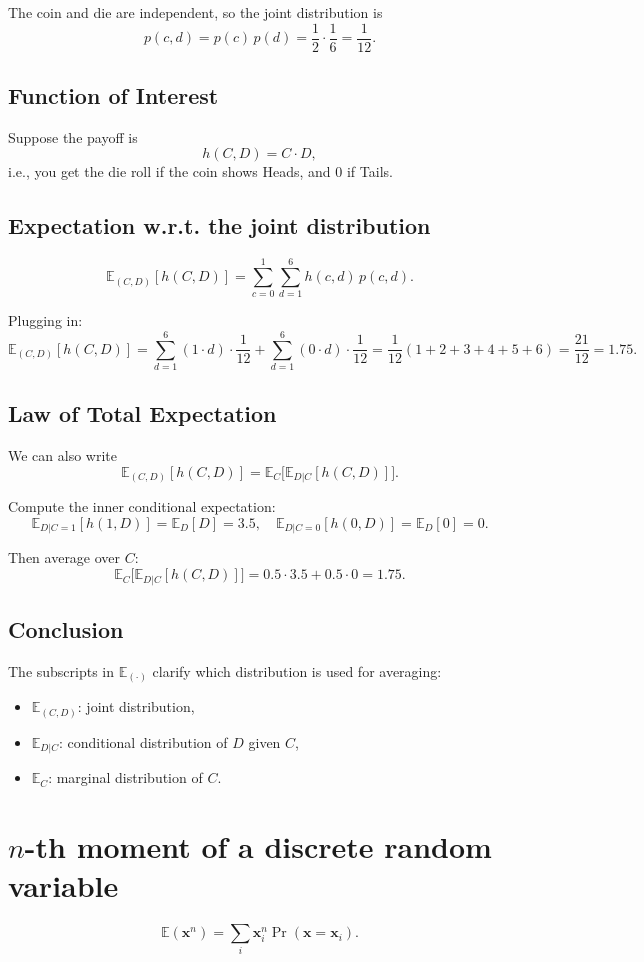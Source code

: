 The coin and die are independent, so the joint distribution is
\[
p(c,d) = p(c)\,p(d) = \frac{1}{2} \cdot \frac{1}{6} = \frac{1}{12}.
\]

\subsection*{Function of Interest}
Suppose the payoff is
\[
h(C,D) = C \cdot D,
\]
i.e., you get the die roll if the coin shows Heads, and 0 if Tails.

\subsection*{Expectation w.r.t. the joint distribution}
\[
\mathbb{E}_{(C,D)}[h(C,D)] 
= \sum_{c=0}^{1} \sum_{d=1}^{6} h(c,d) \, p(c,d).
\]

Plugging in:
\[
\mathbb{E}_{(C,D)}[h(C,D)] 
= \sum_{d=1}^{6} (1 \cdot d) \cdot \frac{1}{12} + \sum_{d=1}^{6} (0 \cdot d) \cdot \frac{1}{12}
= \frac{1}{12} (1+2+3+4+5+6) = \frac{21}{12} = 1.75.
\]

\subsection*{Law of Total Expectation}
We can also write
\[
\mathbb{E}_{(C,D)}[h(C,D)] = \mathbb{E}_C \Big[ \mathbb{E}_{D|C}[h(C,D)] \Big].
\]

Compute the inner conditional expectation:
\[
\mathbb{E}_{D|C=1}[h(1,D)] = \mathbb{E}_D[D] = 3.5, \quad 
\mathbb{E}_{D|C=0}[h(0,D)] = \mathbb{E}_D[0] = 0.
\]

Then average over $C$:
\[
\mathbb{E}_C \Big[ \mathbb{E}_{D|C}[h(C,D)] \Big] 
= 0.5 \cdot 3.5 + 0.5 \cdot 0 = 1.75.
\]

\subsection*{Conclusion}
The subscripts in $\mathbb{E}_{(\cdot)}$ clarify which distribution is used for averaging:
\begin{itemize}
    \item $\mathbb{E}_{(C,D)}$: joint distribution,
    \item $\mathbb{E}_{D|C}$: conditional distribution of $D$ given $C$,
    \item $\mathbb{E}_C$: marginal distribution of $C$.
\end{itemize}

\section{$n$-th moment of a discrete random variable}
\begin{equation}
  \mathbb{E}(\mathbf{x}^n) = \sum_i\mathbf{x}_i^n\Pr(\mathbf{x}=\mathbf{x}_i).
\end{equation}
  
